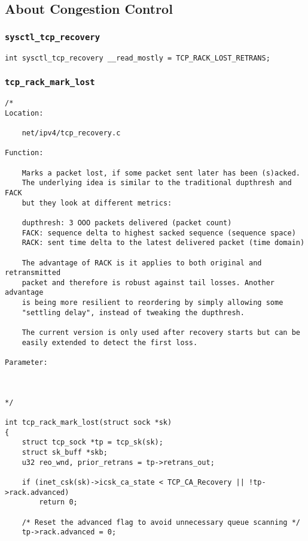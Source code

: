     \subsection{About Congestion Control}
        \subsubsection{\texttt{sysctl_tcp_recovery}}
\begin{verbatim}
int sysctl_tcp_recovery __read_mostly = TCP_RACK_LOST_RETRANS;
\end{verbatim}
        \subsubsection{\texttt{tcp_rack_mark_lost}}
\begin{verbatim}
/*
Location:

    net/ipv4/tcp_recovery.c

Function:

    Marks a packet lost, if some packet sent later has been (s)acked.
    The underlying idea is similar to the traditional dupthresh and FACK
    but they look at different metrics:

    dupthresh: 3 OOO packets delivered (packet count)
    FACK: sequence delta to highest sacked sequence (sequence space)
    RACK: sent time delta to the latest delivered packet (time domain)

    The advantage of RACK is it applies to both original and retransmitted
    packet and therefore is robust against tail losses. Another advantage
    is being more resilient to reordering by simply allowing some
    "settling delay", instead of tweaking the dupthresh.

    The current version is only used after recovery starts but can be
    easily extended to detect the first loss.

Parameter:



*/

int tcp_rack_mark_lost(struct sock *sk)
{
    struct tcp_sock *tp = tcp_sk(sk);
    struct sk_buff *skb;
    u32 reo_wnd, prior_retrans = tp->retrans_out;

    if (inet_csk(sk)->icsk_ca_state < TCP_CA_Recovery || !tp->rack.advanced)
        return 0;

    /* Reset the advanced flag to avoid unnecessary queue scanning */
    tp->rack.advanced = 0;


\end{verbatim}
